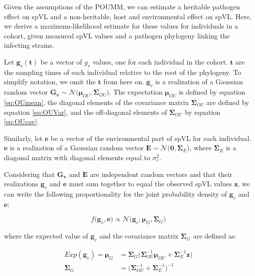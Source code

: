 \documentclass[11pt]{article}
\begin{document}
\begin{linenumbers}
Given the assumptions of the POUMM, we can estimate a heritable pathogen effect on spVL and a non-heritable, host and environmental effect on spVL. Here, we derive a maximum-likelihood estimate for these values for individuals in a cohort, given measured spVL values and a pathogen phylogeny linking the infecting strains.

Let $\bm{g}_v(\bm{t})$ be a vector of $g_v$ values, one for each individual in the cohort. $\bm{t}$ are the sampling times of each individual relative to the root of the phylogeny. To simplify notation, we omit the $\bm{t}$ from here on. $\bm{g}_v$ is a realization of a Gaussian random vector $\bm{G_v} \sim \mathcal{N}\big(\bm{\mu}_{OU}, \boldsymbol{\Sigma}_{OU}\big)$. The expectation $\bm{\mu}_{OU}$ is defined by equation \ref{eq:OUmean}, the diagonal elements of the covariance matrix $\boldsymbol{\Sigma}_{OU}$ are defined by equation \ref{eq:OUVar}, and the off-diagonal elements of $\boldsymbol{\Sigma}_{OU}$ by equation \ref{eq:OUcov}. 

Similarly, let $\bm{e}$ be a vector of the environmental part of spVL for each individual.  $\bm{e}$ is a realization of a Gaussian random vector $\bm{E} \sim \mathcal{N}\big(\bm{0}, \boldsymbol{\Sigma}_E\big)$, where $\boldsymbol{\Sigma}_E$ is a diagonal matrix with diagonal elements equal to $\sigma^2_e$.

Considering that $\bm{G_v}$ and $\bm{E}$ are independent random vectors and that their realizations $\bm{g}_v$ and $\bm{e}$ must sum together to equal the observed spVL values $\bm{z}$, we can write the following proportionality for the joint probability density of $\bm{g}_v$ and $\bm{e}$:

\begin{equation}
	f\big(\bm{g}_v, \bm{e}\big) \propto \mathcal{N}\big(\bm{g}_v; \bm{\mu}_{G}, \boldsymbol{\Sigma}_G\big)
	\label{eq:pdfGprop}
\end{equation} 

where the expected value of $\bm{g}_v$ and the covariance matrix $\boldsymbol{\Sigma}_G$ are defined as:

\begin{align}
	Exp(\bm{g}_v) = \bm{\mu}_{G} &=  \boldsymbol{\Sigma}_G\big(\boldsymbol{\Sigma}_{OU}^{-1}\bm{\mu}_{OU} + \boldsymbol{\Sigma}_E^{-1} \bm{z}\big) \label{eq:MuG}\\
	\boldsymbol{\Sigma}_G &= \big(\boldsymbol{\Sigma}_{OU}^{-1} + \boldsymbol{\Sigma}_E^{-1}\big)^{-1} \label{eq:SigmaG}
\end{align}


\end{linenumbers}
\end{document}
